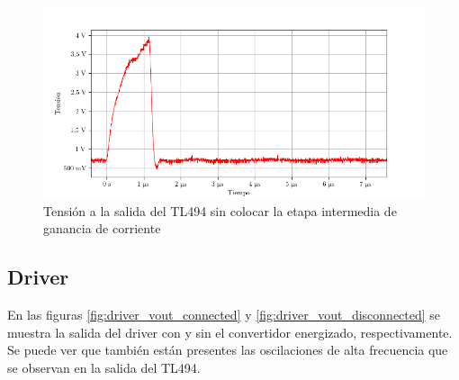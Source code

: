 \begin{figure}[H]
    \centering
    \includegraphics[width=\textwidth]{images/capturas-osciloscopio/TL494/pwm_vout_sin_bjt.png}
    \caption{Tensión a la salida del TL494 sin colocar la etapa intermedia de ganancia de corriente}
    \label{fig:pwm_vout_sin_bjt}
\end{figure}






\subsection{Driver}

En las figuras \ref{fig:driver_vout_connected} y \ref{fig:driver_vout_disconnected} se muestra la salida del driver con y sin el convertidor energizado, respectivamente.
Se puede ver que también están presentes las oscilaciones de alta frecuencia que se observan en la salida del TL494.

